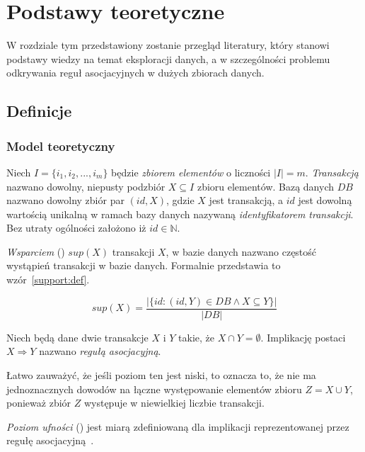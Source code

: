 
\chapter{Podstawy teoretyczne}

W rozdziale tym przedstawiony zostanie przegląd literatury, który stanowi podstawy wiedzy na temat eksploracji danych, a w szczególności problemu odkrywania reguł asocjacyjnych w dużych zbiorach danych.

\section{Definicje}

\subsection{Model teoretyczny}

Niech $I = \lbrace i_1,i_2,...,i_m \rbrace$ będzie \emph{zbiorem elementów} o liczności $|I| = m$. \emph{Transakcją} nazwano dowolny, niepusty podzbiór $X \subseteq I$ zbioru elementów. Bazą danych $DB$ nazwano dowolny zbiór par $(id, X)$, gdzie $X$ jest transakcją, a $id$ jest dowolną wartością unikalną w ramach bazy danych nazywaną \emph{identyfikatorem transakcji}. Bez utraty ogólności założono iż $id\in \mathbb{N}$. 

\emph{Wsparciem} () $sup(X)$ transakcji $X$, w bazie danych nazwano częstość wystąpień transakcji w bazie danych. Formalnie przedstawia to wzór~\ref{support:def}.

\begin{equation}
\label{support:def}
sup(X)=\frac{| \lbrace id: (id,Y)\in DB \wedge X\subseteq Y \rbrace |}{|DB|}
\end{equation} 

\begin{df}\label{regula:def}
Niech będą dane dwie transakcje $X$ i $Y$ takie, że $X\cap Y=\emptyset$. Implikację postaci $X\Rightarrow  Y$ nazwano \emph{regułą asocjacyjną}.
\end{df}

Łatwo zauważyć, że jeśli poziom ten jest niski, to oznacza to, że nie ma jednoznacznych dowodów na łączne występowanie elementów zbioru $Z = X \cup Y$, ponieważ zbiór $Z$ występuje w niewielkiej liczbie transakcji. 

\emph{Poziom ufności} () jest miarą zdefiniowaną dla implikacji reprezentowanej przez regułę asocjacyjną~\cite{Elmasri:db}. 

